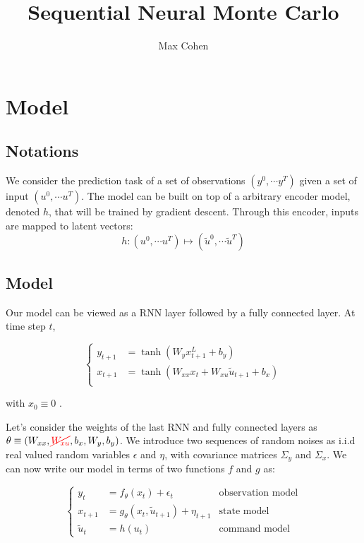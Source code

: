 \documentclass[10pt,a4paper]{report}
\begin{document}
\title{Sequential Neural Monte Carlo}
\author{Max Cohen}

\tableofcontents

\chapter{Model}
\section{Notations}
We consider the prediction task of a set of observations $(y^0, \cdots y^T)$ given a set of input $(u^0, \cdots u^T)$.
The model can be built on top of a arbitrary encoder model, denoted $h$, that will be trained by gradient descent.
Through this encoder, inputs are mapped to latent vectors:
$$
	h: (u^0, \cdots u^T) \mapsto (\tilde u^0, \cdots \tilde u^T)
$$

\section{Model}
Our model can be viewed as a RNN layer followed by a fully connected layer. At time step $t$,

\begin{equation*}
	\left\{
	\begin{aligned}
		y_{t+1} & = \tanh(W_y x_{t+1}^L + b_y)                        \\
		x_{t+1} & = \tanh(W_{xx} x_{t} + W_{xu} \tilde u_{t+1} + b_x) \\
	\end{aligned}
	\right.
\end{equation*}

with $x_{0} \equiv 0$ .

Let's consider the weights of the last RNN and fully connected layers as $\theta \equiv (W_{xx}, \textcolor{red}{\cancel{W_{xu}}}, b_x, W_y, b_y)$.
We introduce two sequences of random noises as i.i.d real valued random variables $\epsilon$ and $\eta$, with covariance matrices $\Sigma_y$ and $\Sigma_x$.
We can now write our model in terms of two functions $f$ and $g$ as:

\begin{equation}
	\left\{
	\begin{aligned}
		y_t        & = f_\theta(x_t) + \epsilon_t                   & \text{observation model} \\
		x_{t+1}    & = g_\theta(x_{t}, \tilde u_{t+1}) + \eta_{t+1} & \text{state model}       \\
		\tilde u_t & = h(u_t)                                       & \text{command model}
	\end{aligned}
	\right.
	\label{model_definition}
\end{equation}
\end{document}
